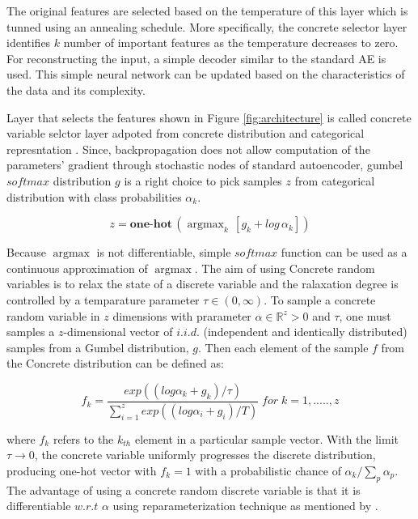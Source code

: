 \documentclass{bioinfo}
\newcommand{\R}{\mathbb{R}}
\DeclareMathOperator*{\argmax}{argmax}
\begin{document}
The original features are selected based on the temperature of this layer which is tunned using an annealing schedule. More specifically, the concrete selector layer identifies $k$ number of important features as the temperature decreases to zero. For reconstructing the input, a simple decoder similar to the standard AE is used. This simple neural network can be updated based on the characteristics of the data and its complexity.

Layer that selects the features shown in Figure \ref{fig:architecture} is called concrete variable selctor layer adpoted from concrete distribution \citep{maddison2016concrete} and categorical represntation \citep{jang2016categorical}. Since, backpropagation does not allow computation of the parameters' gradient through stochastic nodes of standard autoencoder, gumbel $softmax$ distribution $g$ \citep{gumbel1954statistical} is a right choice to pick samples $z$ from categorical distribution with class probabilities $\alpha_k$. 

\begin{equation}
	z = \textbf{one-hot} \, (\argmax_k \, [g_k + log \, \alpha_k])
\end{equation}

Because $\argmax$ is not differentiable, simple $softmax$ function can be used as a continuous approximation of $\argmax$. The aim of using Concrete random variables is to relax the state of a discrete variable and the ralaxation degree is controlled by a temparature parameter $\tau \in (0, \infty)$. To sample a concrete random variable in $z$ dimensions with prarameter $\alpha \in \R ^z>0$ and $\tau$, one must samples a $z$-dimensional vector of $i.i.d.$ (independent and identically distributed) samples from a Gumbel distribution, $g.$ Then each element of the sample $f$ from the Concrete distribution can be defined as:

\begin{equation}
    f_k = \frac{exp((log \alpha_k + g_k)/\tau)}{\sum_{i=1} ^z exp((log \alpha_i + g_i)/T) } \; for \; k = 1,.....,z
\end{equation}

where $f_k$ refers to the $k_{th}$ element in a particular sample
vector. With the limit $\tau \to 0$, the concrete variable uniformly progresses the discrete distribution, producing one-hot vector with $f_k = 1$ with a probabilistic chance of $\alpha _k/\sum_p \alpha _p$.
The advantage of using a concrete random discrete variable is that it is differentiable $w.r.t$ $\alpha$ using reparameterization technique as mentioned by \citep{kingma2013auto}.
\end{document}
